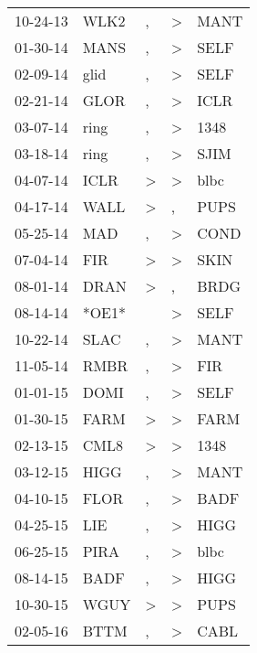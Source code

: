 \begin{supertabular}{lllll}
 10-24-13 &   WLK2 &                , &     \textgreater &   MANT \\
 01-30-14 &   MANS &                , &     \textgreater &   SELF \\
 02-09-14 &   glid &                , &     \textgreater &   SELF \\
 02-21-14 &   GLOR &                , &     \textgreater &   ICLR \\
 03-07-14 &   ring &                , &     \textgreater &   1348 \\
 03-18-14 &   ring &                , &     \textgreater &   SJIM \\
 04-07-14 &   ICLR &     \textgreater &     \textgreater &   blbc \\
 04-17-14 &   WALL &     \textgreater &                , &   PUPS \\
 05-25-14 &    MAD &                , &     \textgreater &   COND \\
 07-04-14 &    FIR &     \textgreater &     \textgreater &   SKIN \\
 08-01-14 &   DRAN &     \textgreater &                , &   BRDG \\
 08-14-14 &  *OE1* &                  &     \textgreater &   SELF \\
 10-22-14 &   SLAC &                , &     \textgreater &   MANT \\
 11-05-14 &   RMBR &                , &     \textgreater &    FIR \\
 01-01-15 &   DOMI &                , &     \textgreater &   SELF \\
 01-30-15 &   FARM &     \textgreater &     \textgreater &   FARM \\
 02-13-15 &   CML8 &     \textgreater &     \textgreater &   1348 \\
 03-12-15 &   HIGG &                , &     \textgreater &   MANT \\
 04-10-15 &   FLOR &                , &     \textgreater &   BADF \\
 04-25-15 &    LIE &                , &     \textgreater &   HIGG \\
 06-25-15 &   PIRA &                , &     \textgreater &   blbc \\
 08-14-15 &   BADF &                , &     \textgreater &   HIGG \\
 10-30-15 &   WGUY &     \textgreater &     \textgreater &   PUPS \\
 02-05-16 &   BTTM &                , &     \textgreater &   CABL \\

\end{supertabular}
